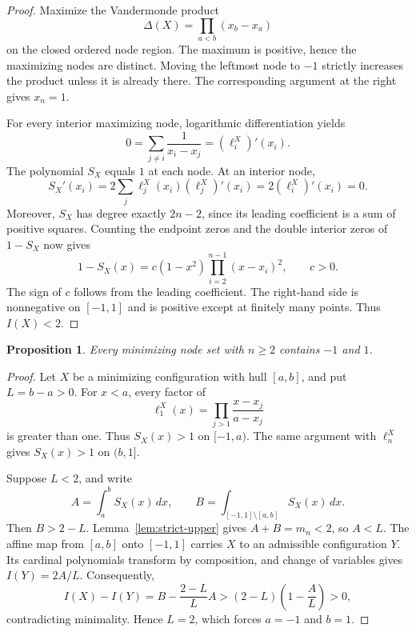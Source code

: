 \documentclass[11pt,leqno]{amsart}
\newtheorem{proposition}[theorem]{Proposition}
\theoremstyle{definition}
\theoremstyle{remark}
\numberwithin{equation}{section}
\begin{document}
\begin{proof}
Maximize the Vandermonde product
\[
 \Delta(X)=\prod_{a<b}(x_b-x_a)
\]
on the closed ordered node region. The maximum is positive, hence the
maximizing nodes are distinct. Moving the leftmost node to $-1$ strictly
increases the product unless it is already there. The corresponding
argument at the right gives $x_n=1$.

For every interior maximizing node, logarithmic differentiation yields
\begin{equation}\label{eq:fekete-derivative}
 0=\sum_{j\ne i}\frac{1}{x_i-x_j}=(\ell_i^X)'(x_i).
\end{equation}
The polynomial $S_X$ equals $1$ at each node. At an interior node,
\[
 S_X'(x_i)=2\sum_j\ell_j^X(x_i)(\ell_j^X)'(x_i)
         =2(\ell_i^X)'(x_i)=0.
\]
Moreover, $S_X$ has degree exactly $2n-2$, since its leading coefficient
is a sum of positive squares. Counting the endpoint zeros and the double
interior zeros of $1-S_X$ now gives
\begin{equation}\label{eq:fekete-factor}
 1-S_X(x)=c(1-x^2)\prod_{i=2}^{n-1}(x-x_i)^2,\qquad c>0.
\end{equation}
The sign of $c$ follows from the leading coefficient. The right-hand
side is nonnegative on $[-1,1]$ and is positive except at finitely many
points. Thus $I(X)<2$.
\end{proof}

\begin{proposition}\label{prop:endpoints}
Every minimizing node set with $n\geq2$ contains $-1$ and $1$.
\end{proposition}

\begin{proof}
Let $X$ be a minimizing configuration with hull $[a,b]$, and put
$L=b-a>0$. For $x<a$, every factor of
\[
 \ell_1^X(x)=\prod_{j>1}\frac{x-x_j}{a-x_j}
\]
is greater than one. Thus $S_X(x)>1$ on $[-1,a)$. The same argument with
$\ell_n^X$ gives $S_X(x)>1$ on $(b,1]$.

Suppose $L<2$, and write
\[
 A=\int_a^b S_X(x)\,dx,\qquad
 B=\int_{[-1,1]\setminus[a,b]}S_X(x)\,dx.
\]
Then $B>2-L$. Lemma~\ref{lem:strict-upper} gives $A+B=m_n<2$, so $A<L$.
The affine map from $[a,b]$ onto $[-1,1]$ carries $X$ to an admissible
configuration $Y$. Its cardinal polynomials transform by composition,
and change of variables gives $I(Y)=2A/L$. Consequently,
\[
 I(X)-I(Y)=B-\frac{2-L}{L}A
          >(2-L)\left(1-\frac{A}{L}\right)>0,
\]
contradicting minimality. Hence $L=2$, which forces $a=-1$ and $b=1$.
\end{proof}
\end{document}
